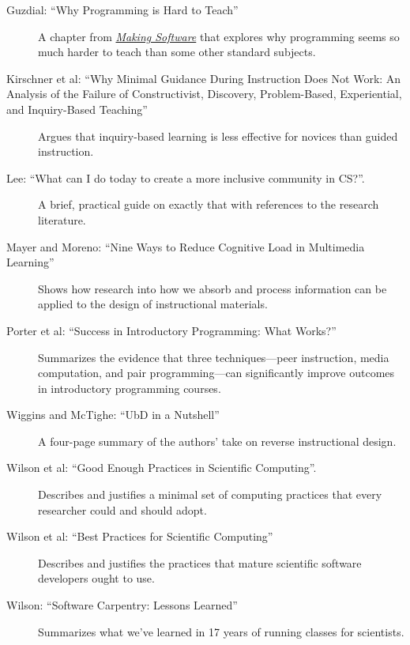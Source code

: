 \begin{description}
\item[Guzdial:
``Why Programming is Hard to Teach'']
A chapter from
\emph{\href{http://www.amazon.com/Making-Software-Really-Works-Believe/dp/0596808321/}{Making
Software}} that explores why programming seems so much harder to teach
than some other standard subjects.
\item[Kirschner et al:
``Why Minimal Guidance During Instruction Does Not Work:
An Analysis of the Failure of Constructivist, Discovery, Problem-Based, Experiential, and Inquiry-Based Teaching'']
Argues that inquiry-based learning is less effective for novices than
guided instruction.
\item[Lee:
``What can I do today to create a more inclusive community in CS?''.]
A brief, practical guide on exactly that with references to the research
literature.
\item[Mayer and Moreno:
``Nine Ways to Reduce Cognitive Load in Multimedia Learning'']
Shows how research into how we absorb and process information can be
applied to the design of instructional materials.
\item[Porter et al:
``Success in Introductory Programming: What Works?'']
Summarizes the evidence that three techniques---peer instruction, media
computation, and pair programming---can significantly improve outcomes
in introductory programming courses.
\item[Wiggins and McTighe:
``UbD in a Nutshell'']
A four-page summary of the authors' take on reverse instructional
design.
\item[Wilson et al: ``Good Enough Practices in Scientific Computing''.]
Describes and justifies a minimal set of computing practices that every
researcher could and should adopt.
\item[Wilson et al:
``Best Practices for Scientific Computing'']
Describes and justifies the practices that mature scientific software
developers ought to use.
\item[Wilson:
``Software Carpentry: Lessons Learned'']
Summarizes what we've learned in 17 years of running classes for
scientists.
\end{description}

